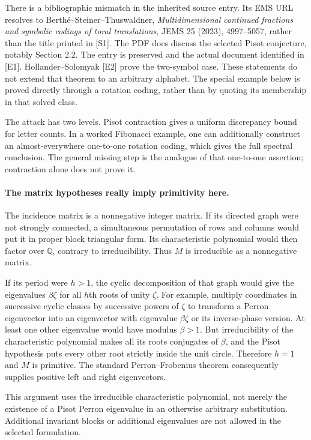 \documentclass[11pt]{article}
\begin{document}
There is a bibliographic mismatch in the inherited source entry. Its EMS
URL resolves to Berth\'e--Steiner--Thuswaldner, \emph{Multidimensional
continued fractions and symbolic codings of toral translations}, JEMS 25
(2023), 4997--5057, rather than the title printed in [S1]. The PDF does
discuss the selected Pisot conjecture, notably Section 2.2. The entry is
preserved and the actual document identified in [E1]. Hollander--Solomyak
[E2] prove the two-symbol case. These statements do not extend that
theorem to an arbitrary alphabet. The special example below is proved
directly through a rotation coding, rather than by quoting its membership
in that solved class.

The attack has two levels. Pisot contraction gives a uniform discrepancy
bound for letter counts. In a worked Fibonacci example, one can additionally
construct an almost-everywhere one-to-one rotation coding, which gives
the full spectral conclusion. The general missing step is the analogue
of that one-to-one assertion; contraction alone does not prove it.

\paragraph{The matrix hypotheses really imply primitivity here.}
The incidence matrix is a nonnegative integer matrix. If its directed
graph were not strongly connected, a simultaneous permutation of rows
and columns would put it in proper block triangular form. Its characteristic
polynomial would then factor over $\mathbb Q$, contrary to irreducibility.
Thus $M$ is irreducible as a nonnegative matrix.

If its period were $h>1$, the cyclic decomposition of that graph would
give the eigenvalues $\beta\zeta$ for all $h$th roots of unity $\zeta$.
For example, multiply coordinates in successive cyclic classes by successive
powers of $\zeta$ to transform a Perron eigenvector into an eigenvector
with eigenvalue $\beta\zeta$ or its inverse-phase version. At least one
other eigenvalue would have modulus $\beta>1$. But irreducibility of the
characteristic polynomial makes all its roots conjugates of $\beta$,
and the Pisot hypothesis puts every other root strictly inside the unit
circle. Therefore $h=1$ and $M$ is primitive. The standard Perron--Frobenius
theorem consequently supplies positive left and right eigenvectors.

This argument uses the irreducible characteristic polynomial, not merely
the existence of a Pisot Perron eigenvalue in an otherwise arbitrary
substitution. Additional invariant blocks or additional eigenvalues are
not allowed in the selected formulation.
\end{document}
